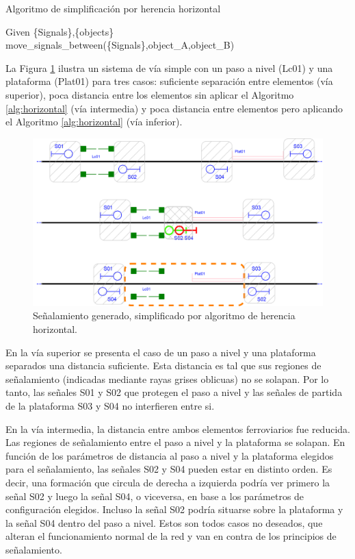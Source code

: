 \begin{algorithm}[hbt!]
	\caption{Algoritmo de simplificación por herencia horizontal}
	\label{alg:horizontal}
	\DontPrintSemicolon
	\SetNoFillComment
	\LinesNotNumbered 
	Given \{Signals\},\{objects\}\\
	{
		{
			{
				{
					move\_signals\_between(\{Signals\},object\_A,object\_B)
				}
			}
		}
	}
\end{algorithm}

La Figura \ref{fig:signal_horizontal} ilustra un sistema de vía simple con un paso a nivel (Lc01) y una plataforma (Plat01) para tres casos: suficiente separación entre elementos (vía superior), poca distancia entre los elementos sin aplicar el Algoritmo \ref{alg:horizontal} (vía intermedia) y poca distancia entre elementos pero aplicando el Algoritmo \ref{alg:horizontal} (vía inferior).

\begin{figure}[h!]
	\centering
	\includegraphics[width=1\textwidth]{Figuras/proximity.PNG}
	\centering\caption{Señalamiento generado, simplificado por algoritmo de herencia horizontal.}
	\label{fig:signal_horizontal}
\end{figure}

En la vía superior se presenta el caso de un paso a nivel y una plataforma separados una distancia suficiente. Esta distancia es tal que sus regiones de señalamiento (indicadas mediante rayas grises oblicuas) no se solapan. Por lo tanto, las señales S01 y S02 que protegen el paso a nivel y las señales de partida de la plataforma S03 y S04 no interfieren entre si.

En la vía intermedia, la distancia entre ambos elementos ferroviarios fue reducida. Las regiones de señalamiento entre el paso a nivel y la plataforma se solapan. En función de los parámetros de distancia al paso a nivel y la plataforma elegidos para el señalamiento, las señales S02 y S04 pueden estar en distinto orden. Es decir, una formación que circula de derecha a izquierda podría ver primero la señal S02 y luego la señal S04, o viceversa, en base a los parámetros de configuración elegidos. Incluso la señal S02 podría situarse sobre la plataforma y la señal S04 dentro del paso a nivel. Estos son todos casos no deseados, que alteran el funcionamiento normal de la red y van en contra de los principios de señalamiento.

